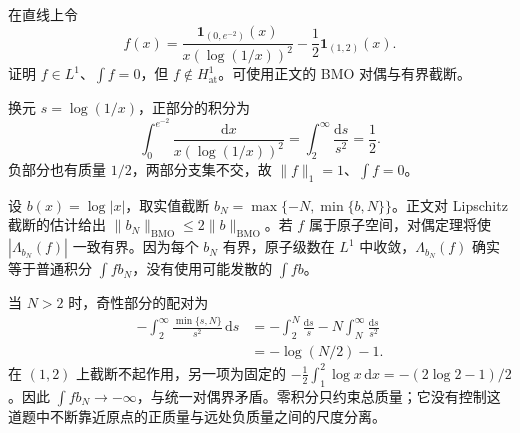 \begin{exercise}\label{b2:ex:app-C-4}
在直线上令
\[
 f(x)=\frac{\mathbf1_{(0,e^{-2})}(x)}{x(\log(1/x))^2}
       -\frac12\mathbf1_{(1,2)}(x).
\]
证明 \(f\in L^1\)、\(\int f=0\)，但 \(f\notin H^1_{\mathrm{at}}\)。可使用正文的 BMO 对偶与有界截断。
\end{exercise}
\begin{solution}
换元 \(s=\log(1/x)\)，正部分的积分为
\[
 \int_0^{e^{-2}}\frac{\mathrm dx}{x(\log(1/x))^2}
 =\int_2^\infty\frac{\mathrm ds}{s^2}=\frac12.
\]
负部分也有质量 \(1/2\)，两部分支集不交，故 \(\|f\|_1=1\)、\(\int f=0\)。

设 \(b(x)=\log|x|\)，取实值截断
\(b_N=\max\{-N,\min\{b,N\}\}\)。正文对 Lipschitz 截断的估计给出 \(\|b_N\|_{\mathrm{BMO}}\leq2\|b\|_{\mathrm{BMO}}\)。若 \(f\) 属于原子空间，对偶定理将使 \(|\Lambda_{b_N}(f)|\) 一致有界。因为每个 \(b_N\) 有界，原子级数在 \(L^1\) 中收敛，\(\Lambda_{b_N}(f)\) 确实等于普通积分 \(\int fb_N\)，没有使用可能发散的 \(\int fb\)。

当 \(N>2\) 时，奇性部分的配对为
\[
 \begin{aligned}
 -\int_2^\infty\frac{\min\{s,N\}}{s^2}\,\mathrm ds
 &=-\int_2^N\frac{\mathrm ds}{s}
   -N\int_N^\infty\frac{\mathrm ds}{s^2}\\
 &=-\log(N/2)-1.
 \end{aligned}
\]
在 \((1,2)\) 上截断不起作用，另一项为固定的
\(-\tfrac12\int_1^2\log x\,\mathrm dx=-(2\log2-1)/2\)。因此 \(\int fb_N\to-\infty\)，与统一对偶界矛盾。零积分只约束总质量；它没有控制这道题中不断靠近原点的正质量与远处负质量之间的尺度分离。
\end{solution}

